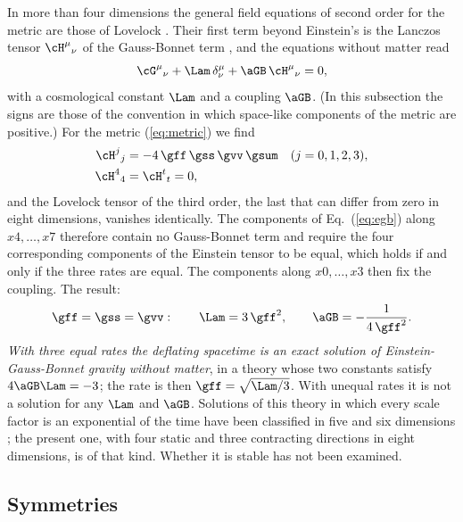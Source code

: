 In more than four dimensions the general field equations of second order for the metric are those of
Lovelock \cite{Lovelock1971}. Their first term beyond Einstein's is the Lanczos tensor
$\cH^{\mu}{}_{\nu}$ of the Gauss-Bonnet term \cite{BoulwareDeser1985}, and the equations without
matter read
\begin{equation}
\cG^{\mu}{}_{\nu}+\Lam\,\delta^{\mu}_{\nu}+\aGB\,\cH^{\mu}{}_{\nu}=0,
\label{eq:egb}
\end{equation}
with a cosmological constant $\Lam$ and a coupling $\aGB$. (In this subsection the signs are those of
the convention in which space-like components of the metric are positive.) For the metric
(\ref{eq:metric}) we find
\begin{equation}
\begin{aligned}
\cH^{j}{}_{j}&=-4\,\gff\,\gss\,\gvv\,\gsum\quad(j=0,1,2,3),\\
\cH^{4}{}_{4}&=\cH^{t}{}_{t}=0,
\end{aligned}
\label{eq:lanczos}
\end{equation}
and the Lovelock tensor of the third order, the last that can differ from zero in eight dimensions,
vanishes identically. The components of Eq.~(\ref{eq:egb}) along $x4,\dots,x7$ therefore contain no
Gauss-Bonnet term and require the four corresponding components of the Einstein tensor to be equal,
which holds if and only if the three rates are equal. The components along $x0,\dots,x3$ then fix the
coupling. The result:
\begin{equation}
\gff=\gss=\gvv:\qquad\Lam=3\,\gff^{2},\qquad\aGB=-\frac{1}{4\,\gff^{2}} .
\label{eq:egbsol}
\end{equation}
\emph{With three equal rates the deflating spacetime is an exact solution of Einstein-Gauss-Bonnet
gravity without matter}, in a theory whose two constants satisfy $4\aGB\Lam=-3$; the rate is then
$\gff=\sqrt{\Lam/3}$. With unequal rates it is not a solution for any $\Lam$ and $\aGB$. Solutions of
this theory in which every scale factor is an exponential of the time have been classified in five
and six dimensions \cite{ChirkovPavluchenkoToporensky2014}; the present one, with four static and
three contracting directions in eight dimensions, is of that kind. Whether it is stable has not been
examined.

\subsection{Symmetries}

